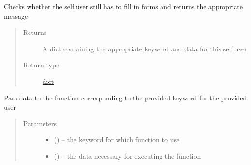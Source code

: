 \documentclass[letterpaper,10pt,english]{sphinxmanual}
\begin{document}
\begin{fulllineitems}
\begin{fulllineitems}
\begin{quote}
\begin{description}
\end{description}\end{quote}

\end{fulllineitems}


\begin{fulllineitems}
\label{\detokenize{controller:controller.Controller.check_prerequisites}}
Checks whether the self.user still has to fill in forms and returns the appropriate message
\begin{quote}\begin{description}
\item[{Returns}] \leavevmode
A dict containing the appropriate keyword and data for this self.user

\item[{Return type}] \leavevmode
\href{https://docs.python.org/2/library/stdtypes.html\#dict}{dict}

\end{description}\end{quote}

\end{fulllineitems}


\begin{fulllineitems}
\label{\detokenize{controller:controller.Controller.controller}}
Pass data to the function corresponding to the provided keyword for the provided user
\begin{quote}\begin{description}
\item[{Parameters}] \leavevmode\begin{itemize}
\item {} 
 (\href{https://docs.python.org/2/library/functions.html\#str}{}) -- the keyword for which function to use

\item {} 
 (\href{https://docs.python.org/2/library/stdtypes.html\#dict}{}\sphinxstyleliteralemphasis{(}\href{https://docs.python.org/2/library/functions.html\#str}{}\sphinxstyleliteralemphasis{, }\href{https://docs.python.org/2/library/functions.html\#str}{}\href{https://docs.python.org/2/library/stdtypes.html\#dict}{}\sphinxstyleliteralemphasis{)}\sphinxstyleliteralemphasis{}) -- the data necessary for executing the function


\end{itemize}
\end{description}
\end{quote}
\end{fulllineitems}
\end{fulllineitems}
\end{document}
